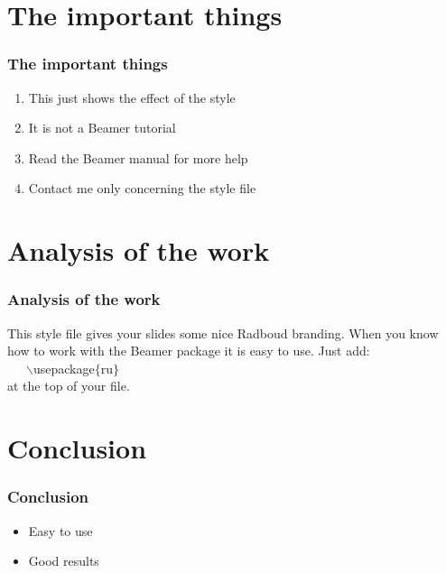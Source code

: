 \documentclass{beamer}
\begin{document}
\section{The important things}

\begin{frame}
  \frametitle{The important things}

  \begin{enumerate}
    \item This just shows the effect of the style
    \item It is not a Beamer tutorial
    \item Read the Beamer manual for more help
    \item Contact me only concerning the style file
  \end{enumerate}
\end{frame}

\section{Analysis of the work}

\begin{frame}
  \frametitle{Analysis of the work}

  This style file gives your slides some nice Radboud branding.
  When you know how to work with the Beamer package it is easy to use.
  Just add:\\ ~~~$\backslash$usepackage$\{$ru$\}$ \\ at the top of your file.
\end{frame}

\section{Conclusion}

\begin{frame}
  \frametitle{Conclusion}

  \begin{itemize}
    \item Easy to use
    \item Good results
  \end{itemize}
\end{frame}
\end{document}
